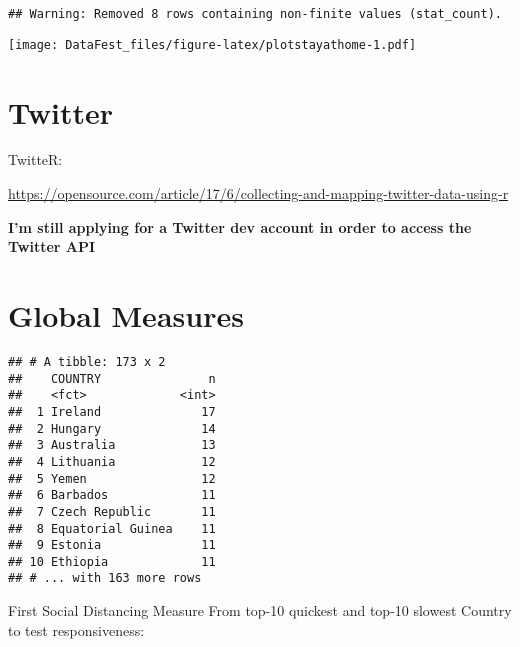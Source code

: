 \documentclass[
]{article}
\newenvironment{Shaded}{\begin{snugshade}}{\end{snugshade}}
\newcommand{\KeywordTok}[1]{\textcolor[rgb]{0.13,0.29,0.53}{\textbf{#1}}}
\newcommand{\NormalTok}[1]{#1}
\newcommand{\OperatorTok}[1]{\textcolor[rgb]{0.81,0.36,0.00}{\textbf{#1}}}
\newcommand{\StringTok}[1]{\textcolor[rgb]{0.31,0.60,0.02}{#1}}
\begin{document}
\begin{verbatim}
## Warning: Removed 8 rows containing non-finite values (stat_count).
\end{verbatim}

\texttt{[image: DataFest\_files/figure-latex/plotstayathome-1.pdf]}

\hypertarget{twitter}{%
\section{Twitter}\label{twitter}}

TwitteR:

\url{https://opensource.com/article/17/6/collecting-and-mapping-twitter-data-using-r}

\textbf{I'm still applying for a Twitter dev account in order to access
the Twitter API}

\hypertarget{global-measures}{%
\section{Global Measures}\label{global-measures}}

\begin{Shaded}
\end{Shaded}

\begin{verbatim}
## # A tibble: 173 x 2
##    COUNTRY               n
##    <fct>             <int>
##  1 Ireland              17
##  2 Hungary              14
##  3 Australia            13
##  4 Lithuania            12
##  5 Yemen                12
##  6 Barbados             11
##  7 Czech Republic       11
##  8 Equatorial Guinea    11
##  9 Estonia              11
## 10 Ethiopia             11
## # ... with 163 more rows
\end{verbatim}

First Social Distancing Measure From top-10 quickest and top-10 slowest
Country to test responsiveness:
\end{document}
